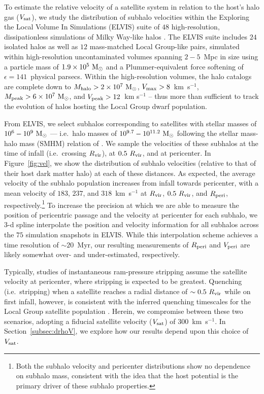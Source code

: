To estimate the relative velocity of a satellite system in relation to
the host's halo gas ($V_{\rm sat}$), we study the distribution of
subhalo velocities within the Exploring the Local Volume In
Simulations (ELVIS) suite of $48$ high-resolution, dissipationless
simulations of Milky Way-like halos \citep{gk14}.
%
The ELVIS suite includes $24$ isolated halos as well as $12$
mass-matched Local Group-like pairs, simulated within high-resolution
uncontaminated volumes spanning $2-5$~Mpc in size using a particle
mass of $1.9 \times 10^{5}~{\rm M}_{\odot}$ and a Plummer-equivalent force
softening of $\epsilon = 141$~physical parsecs. Within the
high-resolution volumes, the halo catalogs are complete down to
$M_{\rm halo} > 2 \times 10^{7}~{\rm M}_{\odot}$, $V_{\rm max} > 8$~km~s$^{-1}$,
$M_{\rm peak} > 6 \times 10^{7}~{\rm M}_{\odot}$, and $V_{\rm peak} > 12$~km
s$^{-1}$ -- thus more than sufficient to track the evolution of halos
hosting the Local Group dwarf population.
%

From ELVIS, we select subhalos corresponding to satellites with
stellar masses of $10^{6}-10^{9}~{\rm M}_{\odot}$ --- i.e.~halo masses of
$10^{9.7}-10^{11.2}~{\rm M}_{\odot}$ following the stellar mass-halo mass (SMHM)
relation of \citet{gk14}. 
%
We sample the velocities of these subhalos at the time of infall
(i.e.~crossing $R_{\rm vir}$), at $0.5~R_{\rm vir}$, and at
pericenter. In Figure~\ref{fig:vel}, we show the distribution of
subhalo velocities (relative to that of their host dark matter halo)
at each of these distances. 
%
As expected, the average velocity of the subhalo population increases
from infall towards pericenter, with a mean velocity of $183$, $237$,
and $318$~km~s$^{-1}$ at $R_{\rm vir}$, $0.5~R_{\rm vir}$, and $R_{\rm
  peri}$, respectively.\footnote{Both the subhalo velocity and
  pericenter distributions show no dependence on subhalo mass,
  consistent with the idea that the host potential is the primary
  driver of these subhalo properties.}
%
To increase the precision at which we are able to measure the position
of pericentric passage and the velocity at pericenter for each subhalo,
we 3-d spline interpolate the position and velocity information for
all subhalos across the $75$ simulation snapshots in ELVIS.
%
While this interpolation scheme achieves a time resolution of
$\sim20$~Myr, our resulting measurements of $R_{\rm peri}$ and $V_{\rm
  peri}$ are likely somewhat over- and under-estimated, respectively.
%


Typically, studies of instantaneous ram-pressure stripping assume the
satellite velocity at pericenter, where stripping is expected to be
greatest.
%
Quenching (i.e.~stripping) when a satellite reaches a radial distance
of $\sim0.5~R_{\rm vir}$ while on first infall, however, is consistent
with the inferred quenching timescales for the Local Group satellite
population \citep{fham15}. 
Herein, we compromise between these two scenarios, adopting a fiducial
satellite velocity ($V_{\rm sat}$) of $300$~km~s$^{-1}$. In
Section~\ref{subsec:drhoV}, we explore how our results depend upon
this choice of $V_{\rm sat}$.




